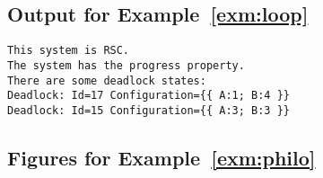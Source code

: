 \begin{appendices}
\subsection*{Output for Example~\ref{exm:loop}}

\begin{lstlisting}[language={},caption={Output of Example~\ref{exm:loop}.},
    label={lst:loop}]
This system is RSC.
The system has the progress property.
There are some deadlock states:
Deadlock: Id=17 Configuration={{ A:1; B:4 }}
Deadlock: Id=15 Configuration={{ A:3; B:3 }}
\end{lstlisting}

\subsection*{Figures for Example~\ref{exm:philo}}\label{apx:philo}

\newpage

\begin{figure}[!ht]
    \centering


\end{figure}
\end{appendices}
